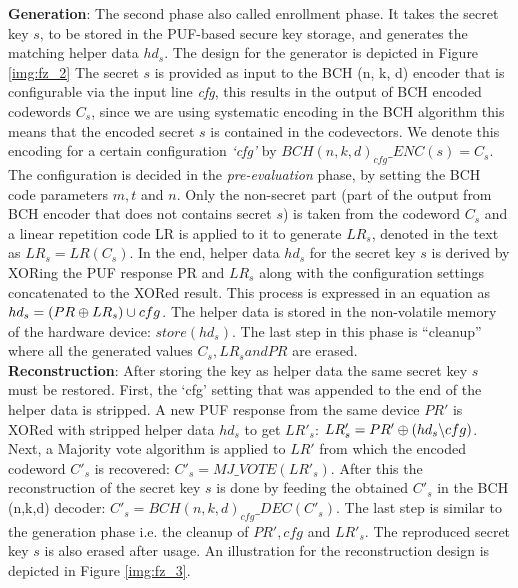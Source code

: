 \textbf{Generation}: The second phase also called enrollment phase. It takes the secret key $s$, to be stored in the PUF-based secure key storage, and generates the matching helper data $hd_s$. The design for the generator is depicted in Figure \ref{img:fz_2}  The secret $s$ is provided as input to the BCH (n, k, d) encoder that is configurable via the input line \emph{cfg}, this results in the output of BCH encoded codewords $C_s$, since we are using systematic encoding in the BCH algorithm this means that
the encoded secret $s$ is contained in the codevectors. We denote this encoding for a certain configuration \emph{`cfg'} by $BCH(n,k,d)_{cfg}\_ENC(s) = C_s$. The configuration is decided in the \emph{pre-evaluation} phase, by setting the BCH code parameters $m, t$ and $n$.
Only the non-secret part (part of the output from BCH encoder that does not contains secret $s$) is taken from the codeword $C_s$ and a linear repetition code LR is applied to it to generate $LR_s$, denoted in the text as $LR_s = LR(C_s)$. In the end, helper data $hd_s$ for the secret key $s$ is derived by XORing the PUF response PR and $LR_s$ along with the configuration settings concatenated to the XORed result. This process is expressed in an equation as $hd_s = (PR \mathbin{\oplus} LR_s) \cup cfg$.
The helper data is stored in the non-volatile memory of the hardware device: $store(hd_s)$. The last step in this phase is ``cleanup'' where all the generated values $C_s, LR_s and PR$ are erased.\\

\textbf{Reconstruction}: After storing the key as helper data the same secret key $s$ must be restored. First, the `cfg' setting that was appended to the end of the helper data is stripped. A new PUF response from the same device $PR'$ is XORed with stripped helper data $hd_s$ to get $LR'_s$: $LR'_s = PR' \mathbin{\oplus} (hd_s \backslash cfg)$. Next, a Majority vote algorithm is applied to $LR'$ from which the encoded codeword $C'_s$ is recovered: $C'_s = MJ\_VOTE(LR'_s)$. After this the
reconstruction of the secret key $s$ is done by feeding the obtained $C'_s$ in the BCH (n,k,d) decoder: $C'_s = BCH(n,k,d)_{cfg}\_DEC(C'_s)$. The last step is similar to the generation phase i.e. the cleanup of $PR', cfg$ and $LR'_s$. The reproduced secret key $s$ is also erased after usage. An illustration for the reconstruction design is depicted in Figure \ref{img:fz_3}.

